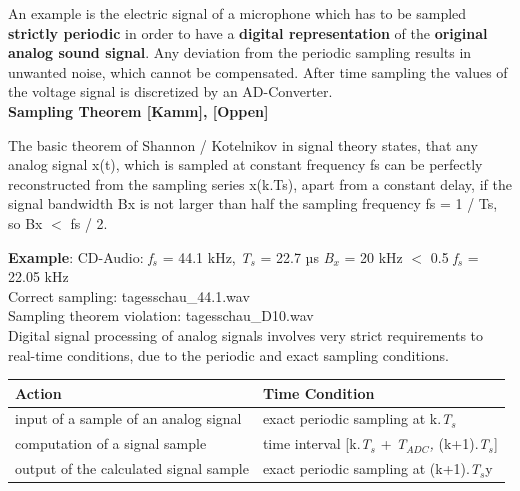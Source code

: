 An example is the electric signal of a microphone which has to be sampled \textbf{strictly periodic} in order to have a \textbf{digital representation} of the \textbf{original analog sound signal}. Any deviation from the periodic sampling results in unwanted noise, which cannot be compensated. After time sampling the values of the voltage signal is discretized by an AD-Converter.\\

{\rot\bf Sampling Theorem [Kamm], [Oppen]}

\begin{tcolorbox}[colback=blue!5!white,colframe=blue!75!black]
  The basic theorem of Shannon / Kotelnikov in signal theory states, that any analog signal x(t), which is sampled at constant frequency fs can be perfectly reconstructed from the sampling series x(k.Ts), apart from a constant delay, if the signal bandwidth Bx is not larger than half the sampling frequency fs = 1 / Ts, so Bx $<$ fs / 2.
\end{tcolorbox}

\textbf{Example}: CD-Audio: \textit{f}${}_{s}$ = 44.1 kHz, \textit{T}${}_{s}$ = 22.7 µs  \textit{B${}_{x}$} = 20 kHz $\mathrm{<}$ 0.5 \textit{f}${}_{s}$ = 22.05 kHz \\

Correct sampling:       tagesschau\_44.1.wav \\
Sampling theorem violation:  tagesschau\_D10.wav\\

Digital signal processing of analog signals involves very strict requirements to real-time conditions, due to the periodic and exact sampling conditions.\\


\begin{table}[h!]
\setlength{\tabcolsep}{10pt} %
\renewcommand{\arraystretch}{1.5} %
\centering
 \begin{tabular}{|l|l|} 
 \hline
 \textbf{Action} & \textbf{Time Condition} \\ [0.1ex] 
 \hline
 input of a sample of an analog signal & exact periodic sampling at  k.\textit{T}${}_{s}$ \\ 
 \hline
 computation of a signal sample & time interval [k.\textit{T}${}_{s}$ + \textit{T${}_{ADC}$,} (k+1).\textit{T}${}_{s}$] \\ 
  \hline
 output of the calculated signal sample & exact periodic sampling at  (k+1).\textit{T}${}_{s}$y  \\ 
 \hline
 \end{tabular}
\end{table}

